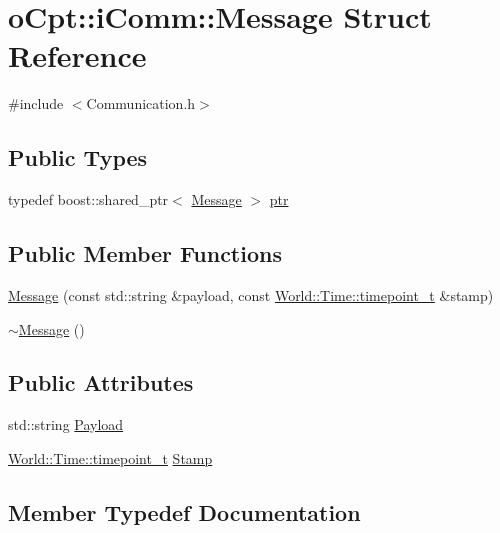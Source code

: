 \hypertarget{structo_cpt_1_1i_comm_1_1_message}{}\section{o\+Cpt\+:\+:i\+Comm\+:\+:Message Struct Reference}
\label{structo_cpt_1_1i_comm_1_1_message}


{\ttfamily \#include $<$Communication.\+h$>$}

\subsection*{Public Types}
\begin{DoxyCompactItemize}
\item 
typedef boost\+::shared\+\_\+ptr$<$ \hyperlink{structo_cpt_1_1i_comm_1_1_message}{Message} $>$ \hyperlink{structo_cpt_1_1i_comm_1_1_message_ad2ba828ad76f96a30e3898b2609a4c01}{ptr}
\end{DoxyCompactItemize}
\subsection*{Public Member Functions}
\begin{DoxyCompactItemize}
\item 
\hyperlink{structo_cpt_1_1i_comm_1_1_message_acabc9841f33a226d3670e524ef8f69c5}{Message} (const std\+::string \&payload, const \hyperlink{classo_cpt_1_1_world_1_1_time_a6a6e782c3c90622c1c7070b0a223ec4c}{World\+::\+Time\+::timepoint\+\_\+t} \&stamp)
\item 
\hyperlink{structo_cpt_1_1i_comm_1_1_message_a9f3e20489859c6ff3222f88234b1c93c}{$\sim$\+Message} ()
\end{DoxyCompactItemize}
\subsection*{Public Attributes}
\begin{DoxyCompactItemize}
\item 
std\+::string \hyperlink{structo_cpt_1_1i_comm_1_1_message_a46117baa6509fd31f7e8cb187cc3f8a9}{Payload}
\item 
\hyperlink{classo_cpt_1_1_world_1_1_time_a6a6e782c3c90622c1c7070b0a223ec4c}{World\+::\+Time\+::timepoint\+\_\+t} \hyperlink{structo_cpt_1_1i_comm_1_1_message_ad00181a6c0e5cc88b61f808c1638972f}{Stamp}
\end{DoxyCompactItemize}


\subsection{Member Typedef Documentation}
